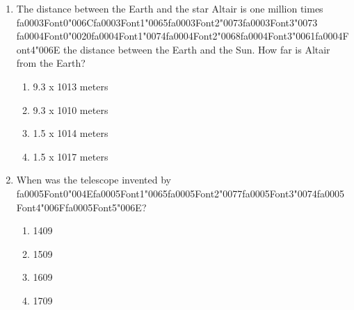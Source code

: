 \documentclass[12pt]{article}
\begin{document}
\begin{enumerate}[label=\arabic*.]
Moon?
\begin{enumerate}[label=(\alph*)]
    \item The Moon split from the Earth due to tidal forces.
    \item The Moon was captured into Earth orbit.
    \item The Earth and Moon co-accreted in the solar nebula.
    \item Earth was rotating so rapidly that the Moon split from it.
\end{enumerate}
\item The distance between the Earth and the star Altair is one million times {\csname fa0003Font0\endcsname\char"006C}{\csname fa0003Font1\endcsname\char"0065}{\csname fa0003Font2\endcsname\char"0073}{\csname fa0003Font3\endcsname\char"0073} {\csname fa0004Font0\endcsname\char"0020}{\csname fa0004Font1\endcsname\char"0074}{\csname fa0004Font2\endcsname\char"0068}{\csname fa0004Font3\endcsname\char"0061}{\csname fa0004Font4\endcsname\char"006E} the
distance between the Earth and the Sun. How far is Altair from the Earth?
\begin{enumerate}[label=(\alph*)]
    \item 9.3 x 1013 meters
    \item 9.3 x 1010 meters
    \item 1.5 x 1014 meters
    \item 1.5 x 1017 meters
\end{enumerate}
\item When was the telescope invented by {\csname fa0005Font0\endcsname\char"004E}{\csname fa0005Font1\endcsname\char"0065}{\csname fa0005Font2\endcsname\char"0077}{\csname fa0005Font3\endcsname\char"0074}{\csname fa0005Font4\endcsname\char"006F}{\csname fa0005Font5\endcsname\char"006E}?
\begin{enumerate}[label=(\alph*)]
    \item 1409
    \item 1509
    \item 1609
    \item 1709
\end{enumerate}
\end{enumerate}
\end{document}
